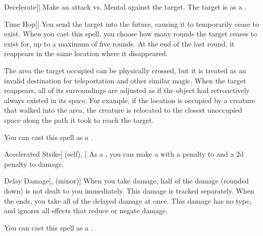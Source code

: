 \lowercase{\hypertarget{spell:Decelerate}{}}\label{spell:Decelerate}
\begin{freeability}[Rank 3]{\hypertarget{spell:Decelerate}{Decelerate}}[]
Make an attack vs. Mental against the target.
\hit The target is  as a .
\end{freeability}
\vspace{0.25em}



\lowercase{\hypertarget{spell:Time Hop}{}}\label{spell:Time Hop}
\begin{freeability}[Rank 3]{\hypertarget{spell:Time Hop}{Time Hop}}[]
You send the target into the future, causing it to temporarily cease to exist.
When you cast this spell, you choose how many rounds the target ceases to exist for, up to a maximum of five rounds.
At the end of the last round, it reappears in the same location where it disappeared.

The area the target occupied can be physically crossed, but it is treated as an invalid destination for teleportation and other similar magic.
When the target reappears, all of its surroundings are adjusted as if the object had retroactively always existed in its space.
For example, if the location is occupied by a creature that walked into the area, the creature is relocated to the closest unoccupied space along the path it took to reach the target.

You can cast this spell as a .
\end{freeability}
\vspace{0.25em}



\lowercase{\hypertarget{spell:Accelerated Strike}{}}\label{spell:Accelerated Strike}
\begin{attuneability}[Rank 4]{\hypertarget{spell:Accelerated Strike}{Accelerated Strike}}[ (self), ]
As a , you can make a  with a  penalty to  and a \minus2d penalty to damage.
\end{attuneability}
\vspace{0.25em}



\lowercase{\hypertarget{spell:Delay Damage}{}}\label{spell:Delay Damage}
\begin{freeability}[Rank 4]{\hypertarget{spell:Delay Damage}{Delay Damage}}[,  (minor)]
When you take damage, half of the damage (rounded down) is not dealt to you immediately.
This damage is tracked separately.
When the ends, you take all of the delayed damage at once.
This damage has no type, and ignores all effects that reduce or negate damage.

You can cast this spell as a .
\end{freeability}
\vspace{0.25em}



